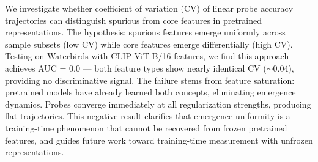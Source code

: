 We investigate whether coefficient of variation (CV) of linear probe accuracy trajectories can distinguish spurious from core features in pretrained representations. The hypothesis: spurious features emerge uniformly across sample subsets (low CV) while core features emerge differentially (high CV). Testing on Waterbirds with CLIP ViT-B/16 features, we find this approach achieves AUC = 0.0 --- both feature types show nearly identical CV ($\sim$0.04), providing no discriminative signal. The failure stems from feature saturation: pretrained models have already learned both concepts, eliminating emergence dynamics. Probes converge immediately at all regularization strengths, producing flat trajectories. This negative result clarifies that emergence uniformity is a training-time phenomenon that cannot be recovered from frozen pretrained features, and guides future work toward training-time measurement with unfrozen representations.
